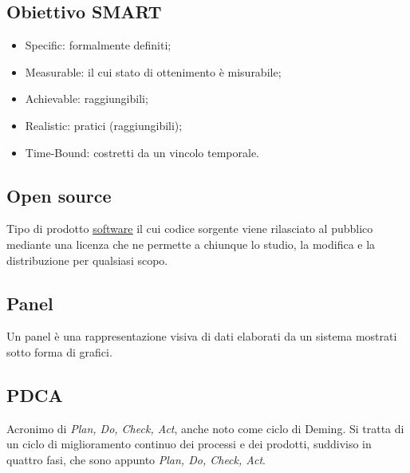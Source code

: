 				
						\subsection{Obiettivo SMART}
				\label{sec:smart}
				\begin{itemize}  
					\item Specific: formalmente definiti;
					\item Measurable: il cui stato di ottenimento è misurabile;
					\item Achievable: raggiungibili;
					\item Realistic: pratici (raggiungibili);
					\item Time-Bound: costretti da un vincolo temporale.
				\end{itemize}
				
				\subsection{Open source}
				\label{sec:opensource}
				Tipo di prodotto \underline{\hyperref[sec:prodottosoftware]{software}} il cui codice sorgente viene rilasciato al pubblico mediante una licenza che ne permette a chiunque lo studio, la modifica e la distribuzione per qualsiasi scopo.
				\newpage

	
	\subsection{Panel}
	\label{sec:panel}
	Un panel è una rappresentazione visiva di dati elaborati da un sistema mostrati sotto forma di grafici.
	
	
	\subsection{PDCA}	
	\label{sec:pdca}
	Acronimo di \emph{Plan, Do, Check, Act}, anche noto come ciclo di Deming. Si tratta di un ciclo di miglioramento continuo dei processi e dei prodotti, suddiviso in quattro fasi, che sono appunto \emph{Plan, Do, Check, Act}.
	
